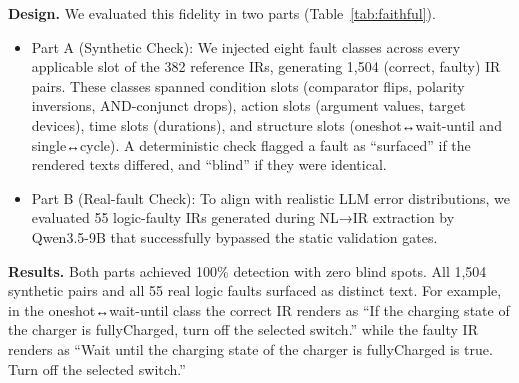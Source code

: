 \documentclass[sigconf,nonacm,anonymous,review]{acmart}
\begin{document}
\textbf{Design.} We evaluated this fidelity in two parts (Table~\ref{tab:faithful}).
\begin{itemize}
    \item Part A (Synthetic Check): We injected eight fault classes across every applicable slot of the 382 reference IRs, generating 1,504 (correct, faulty) IR pairs. These classes spanned condition slots (comparator flips, polarity inversions, AND-conjunct drops), action slots (argument values, target devices), time slots (durations), and structure slots (oneshot↔wait-until and single↔cycle). A deterministic check flagged a fault as ``surfaced'' if the rendered texts differed, and ``blind'' if they were identical.
    \item Part B (Real-fault Check): To align with realistic LLM error distributions, we evaluated 55 logic-faulty IRs generated during NL→IR extraction by Qwen3.5-9B that successfully bypassed the static validation gates.
\end{itemize}

\textbf{Results.} Both parts achieved 100\% detection with zero blind spots. All 1,504 synthetic pairs and all 55 real logic faults surfaced as distinct text. %
For example, in the oneshot↔wait-until class the correct IR renders as ``If the charging state of the charger is fullyCharged, turn off the selected switch.'' while the faulty IR renders as ``Wait until the charging state of the charger is fullyCharged is true. Turn off the selected switch.''
\end{document}
